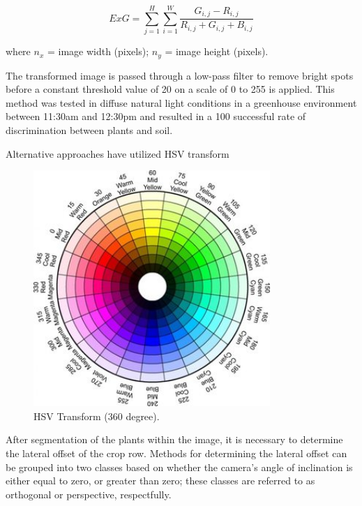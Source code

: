 \documentclass[authoryear]{elsarticle}
\begin{document}
\begin{equation}
    ExG = \displaystyle\sum_{j=1}^{H} \displaystyle\sum_{i=1}^{W} \frac{G_{i,j}-R_{i,j}}{R_{i,j} + G_{i,j} + B_{i,j}}
\end{equation}
\begin{flushleft}
where $n_{x}$ = image width (pixels); $n_{y}$ = image height (pixels).
\end{flushleft}

The transformed image is passed through a low-pass filter to remove
bright spots before a constant threshold value of 20 on a scale of 0
to 255 is applied. This method was tested in diffuse natural light
conditions in a greenhouse environment between 11:30am and 12:30pm and
resulted in a 100 successful rate of discrimination between plants and
soil.

Alternative approaches have utilized HSV transform

\begin{figure}
  \centering
  \includegraphics[width=0.8\textwidth,natwidth=610,natheight=642]{hsv.jpg}
  \caption{HSV Transform (360 degree).}
  \label{fig:hsv}
\end{figure}

After segmentation of the plants within the image, it is necessary to
determine the lateral offset of the crop row. Methods for determining
the lateral offset can be grouped into two classes based on whether
the camera’s angle of inclination is either equal to zero, or greater
than zero; these classes are referred to as orthogonal or perspective,
respectfully. 
\end{document}
